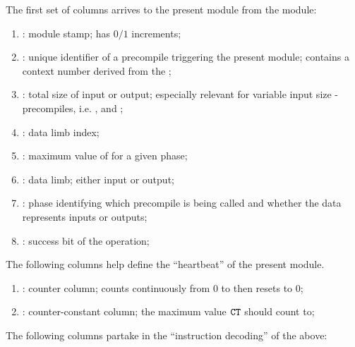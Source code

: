The first set of columns arrives to the present module from the \mmioMod{} module:
\begin{enumerate}
    \item
        \blsStamp{}:
        module stamp;
        has $0/1$ increments;
    \item
        \hubMmuMmioBlsInput{}
        \blsId{}:
        unique identifier of a precompile  triggering the present module;
        contains a context number derived from the \hubStamp{};
    \item
        \hubMmuMmioBlsInput{}
        \blsTotalSize{}:
        total size of input or output;
        especially relevant for variable input size -precompiles, i.e.
        \instBlsGOneMsm{},
        \instBlsGTwoMsm{} and
        \instBlsPairingCheck{};
    \item
        \hubMmuMmioBlsInput{}
        \blsIndex{}:
        data limb index;
    \item
        \indexMax{}:
        maximum value of \blsIndex{} for a given phase;
    \item
        \hubMmuMmioBlsInput{}
        \blsLimb{}:
        data limb; either input or output;
    \item
        \hubMmuMmioBlsInput{}
        \blsPhase{}:
        phase identifying which precompile is being called and whether the data represents inputs or outputs;
    \item
        \hubMmuMmioBlsPrediction{}
        \blsSuccessBit{}:
        success bit of the operation;
\end{enumerate}
The following columns help define the ``heartbeat'' of the present module. 
\begin{enumerate}[resume]
    \item
        \ct:
        counter column;
        counts continuously from $0$ to \maxCt{} then resets to $0$;
    \item
        \maxCt:
        counter-constant column;
        the maximum value $\texttt{CT}$ should count to;
\end{enumerate}
The following columns partake in the ``instruction decoding'' of the above:
